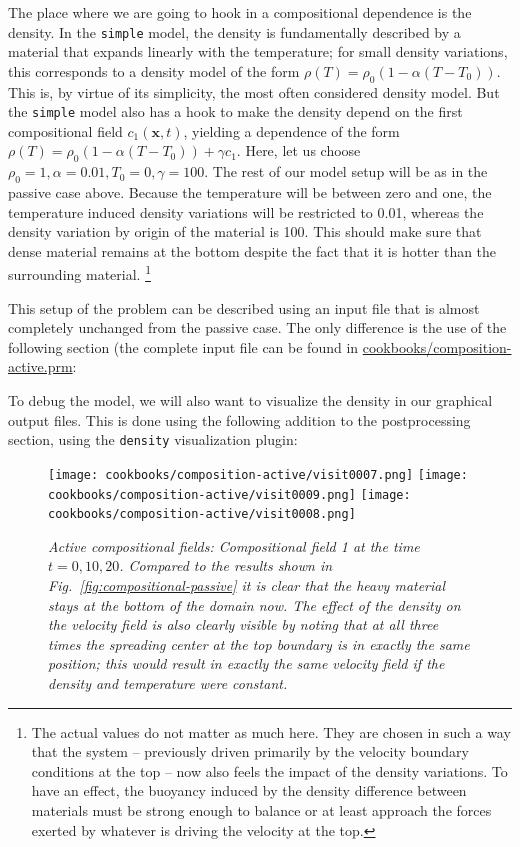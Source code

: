 \documentclass{article}
\begin{document}
The place where we are going to hook in a compositional dependence is the
density. In the \texttt{simple} model, the density is fundamentally described by
a material that expands linearly with the temperature; for small density
variations, this corresponds to a density model of the form
$\rho(T)=\rho_0(1-\alpha(T-T_0))$. This is, by virtue of its simplicity, the
most often considered density model. But the \texttt{simple} model also has a
hook to make the density depend on the first compositional field $c_1(\mathbf
x,t)$, yielding a dependence of the form
$\rho(T)=\rho_0(1-\alpha(T-T_0))+\gamma c_1$. Here, let us choose $\rho_0=1,
\alpha=0.01, T_0=0, \gamma=100$. The rest of our model setup will be as
in the passive case above. Because the temperature will be between zero and one,
the temperature induced density variations will be restricted to 0.01, whereas
the density variation by origin of the material is 100. This should make sure
that dense material remains at the bottom despite the fact that it is hotter
than the surrounding material.%
\footnote{The actual values do not matter as much here. They are chosen in such
a way that the system -- previously driven primarily by the velocity boundary
conditions at the top -- now also feels the impact of the density variations.
To have an effect, the buoyancy induced by the density difference between
materials must be strong enough to balance or at least approach the forces
exerted by whatever is driving the velocity at the top.}

This setup of the problem can be described using an input file that is almost
completely unchanged from the passive case. The only difference is the use of
the following section (the complete input file can be found in
\url{cookbooks/composition-active.prm}:




To debug the model, we will also want to visualize the density in our
graphical output files. This is done using the following addition to the
postprocessing section, using the \texttt{density} visualization plugin:



\begin{figure}
  \centering
  \centering
  \texttt{[image: cookbooks/composition-active/visit0007.png]}
  \hfill
  \texttt{[image: cookbooks/composition-active/visit0009.png]}
  \hfill
  \texttt{[image: cookbooks/composition-active/visit0008.png]}
  \caption{\it Active compositional fields: Compositional field 1 at the time
    $t=0, 10, 20$. Compared to the results shown in
    Fig.~\ref{fig:compositional-passive} it is clear that the heavy material
    stays at the bottom of the domain now. The effect of the density on the
    velocity field is also clearly visible by noting that at all three times
    the spreading center at the top boundary is in exactly the same position;
    this would result in exactly the same velocity field if the density and
    temperature were constant.}
  \label{fig:composition-active-composition}
\end{figure}
\end{document}
